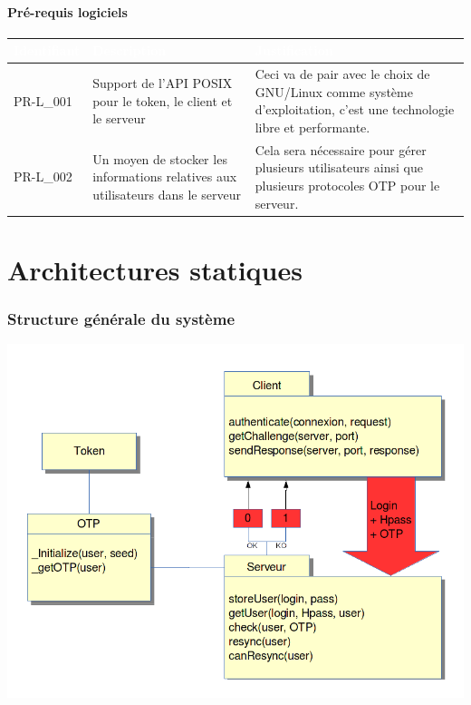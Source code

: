 \documentclass{"../../res/univ-projet"}
\begin{document}
\subsection{Pré-requis logiciels}
\begin{tabular}{|p{}|p{}|p{}|}
    \hline
    \rowcolor{gray}
    \textcolor{white}{\bfseries Identifiant} & 
    \textcolor{white}{\bfseries Description} &
    \textcolor{white}{\bfseries Justification} \\
    \hline
    PR-L\_001 &
    Support de l'API POSIX pour le token, le client et le serveur &
    Ceci va de pair avec le choix de GNU/Linux comme système d'exploitation,
    c'est une technologie libre et performante.\\
    \hline
    PR-L\_002 &
    Un moyen de stocker les informations relatives aux utilisateurs dans le serveur&
    Cela sera nécessaire pour gérer plusieurs utilisateurs ainsi que plusieurs protocoles
    OTP pour le serveur.\\
    \hline
\end{tabular}


\part*{Architectures statiques}
\section{Structure générale du système}
\includegraphics[width=\textwidth]{../graphics/architecture.png}
\end{document}
